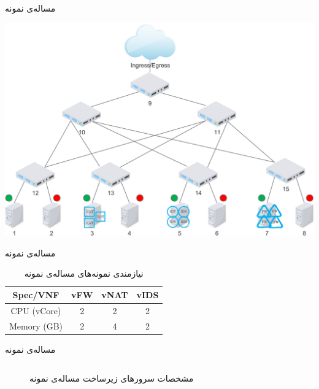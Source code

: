 \documentclass{beamer}
\begin{document}
\begin{persian}
\begin{frame}{مساله‌ی نمونه}
    \begin{center}
        \includegraphics[scale=0.4]{./images/topology.pdf}
    \end{center}
\end{frame}
\begin{frame}{مساله‌ی نمونه}
    \begin{table}[h]
        \caption{نیازمندی نمونه‌های مساله‌ی نمونه}
        \vspace{0.5cm}
        \begin{center}\begin{latin}\begin{tabular}{|c|c|c|c|}
            \hline
            Spec/VNF & vFW & vNAT & vIDS \\
            \hline
            CPU (vCore) & 2 & 2 & 2 \\
            \hline
            Memory (GB) & 2 & 4 & 2 \\
            \hline
        \end{tabular}\end{latin}\end{center}
    \end{table}
\end{frame}
\begin{frame}{مساله‌ی نمونه}
    \begin{figure}[h!]
        \caption{مشخصات سرورهای زیرساخت مساله‌ی نمونه}
        \vspace{0.5cm}
        \begin{center}\begin{latin}\begin{tabular}{|c|c|c|}

\end{tabular}
\end{latin}
\end{center}
\end{figure}
\end{frame}
\end{persian}
\end{document}
